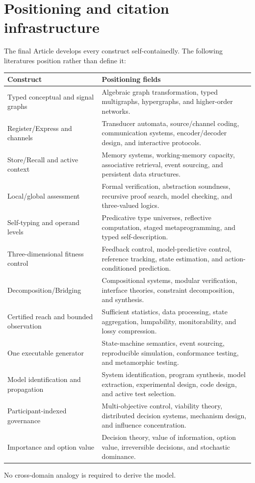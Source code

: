 \documentclass[11pt]{article}
\begin{document}
\section{Positioning and citation infrastructure}

The final Article develops every construct self-containedly. The following literatures position rather than define it:
\begin{longtable}{p{}p{}}
\toprule
\textbf{Construct} & \textbf{Positioning fields}\\
\midrule\endhead
Typed conceptual and signal graphs & Algebraic graph transformation, typed multigraphs, hypergraphs, and higher-order networks.\\
Register/Express and channels & Transducer automata, source/channel coding, communication systems, encoder/decoder design, and interactive protocols.\\
Store/Recall and active context & Memory systems, working-memory capacity, associative retrieval, event sourcing, and persistent data structures.\\
Local/global assessment & Formal verification, abstraction soundness, recursive proof search, model checking, and three-valued logics.\\
Self-typing and operand levels & Predicative type universes, reflective computation, staged metaprogramming, and typed self-description.\\
Three-dimensional fitness control & Feedback control, model-predictive control, reference tracking, state estimation, and action-conditioned prediction.\\
Decomposition/Bridging & Compositional systems, modular verification, interface theories, constraint decomposition, and synthesis.\\
Certified reach and bounded observation & Sufficient statistics, data processing, state aggregation, lumpability, monitorability, and lossy compression.\\
One executable generator & State-machine semantics, event sourcing, reproducible simulation, conformance testing, and metamorphic testing.\\
Model identification and propagation & System identification, program synthesis, model extraction, experimental design, code design, and active test selection.\\
Participant-indexed governance & Multi-objective control, viability theory, distributed decision systems, mechanism design, and influence concentration.\\
Importance and option value & Decision theory, value of information, option value, irreversible decisions, and stochastic dominance.\\
\bottomrule
\end{longtable}
No cross-domain analogy is required to derive the model.
\end{document}
